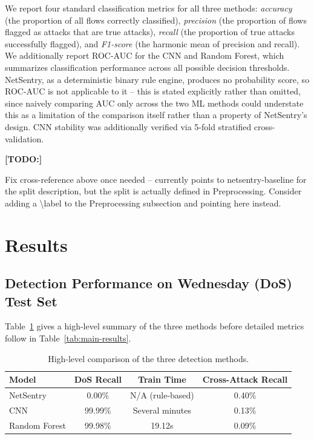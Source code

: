 \documentclass[conference]{IEEEtran}
\newenvironment{todo}
  {\par\noindent\color{red}\bfseries[TODO:]\normalfont\color{red}\begin{itshape}}
  {\end{itshape}\par\normalfont\color{black}}
\begin{document}
We report four standard classification metrics for all three methods: \emph{accuracy} (the proportion of all flows correctly classified), \emph{precision} (the proportion of flows flagged as attacks that are true attacks), \emph{recall} (the proportion of true attacks successfully flagged), and \emph{F1-score} (the harmonic mean of precision and recall). We additionally report ROC-AUC for the CNN and Random Forest, which summarizes classification performance across all possible decision thresholds. NetSentry, as a deterministic binary rule engine, produces no probability score, so ROC-AUC is not applicable to it -- this is stated explicitly rather than omitted, since naively comparing AUC only across the two ML methods could understate this as a limitation of the comparison itself rather than a property of NetSentry's design. CNN stability was additionally verified via 5-fold stratified cross-validation.
 
\begin{todo}
Fix cross-reference above once needed -- currently points to netsentry-baseline for the split description, but the split is actually defined in Preprocessing. Consider adding a \textbackslash label to the Preprocessing subsection and pointing here instead.
\end{todo}
 
\section{Results}
\label{results-section}
\subsection{Detection Performance on Wednesday (DoS) Test Set}
 
Table~\ref{tab:summary} gives a high-level summary of the three methods before detailed metrics follow in Table~\ref{tab:main-results}.
 
\begin{table}[htbp]
\caption{High-level comparison of the three detection methods.}
\begin{center}
\begin{tabular}{lccc}
\toprule
\textbf{Model} & \textbf{DoS Recall} & \textbf{Train Time} & \textbf{Cross-Attack Recall} \\
\midrule
NetSentry & 0.00\% & N/A (rule-based) & 0.40\% \\
CNN & 99.99\% & Several minutes & 0.13\% \\
Random Forest & 99.98\% & 19.12s & 0.09\% \\
\bottomrule
\end{tabular}
\label{tab:summary}
\end{center}
\end{table}
 
\end{document}
